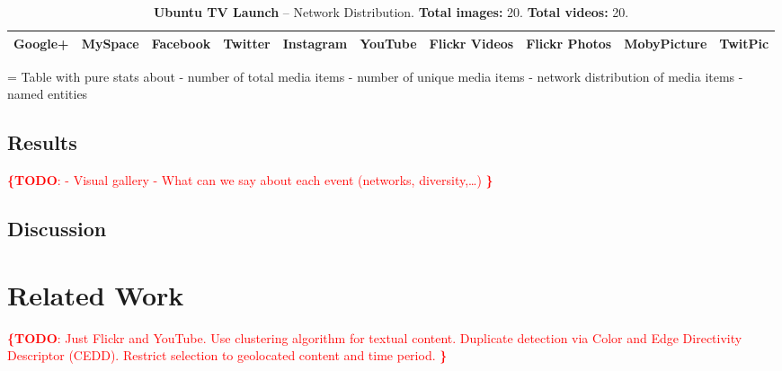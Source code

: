\documentclass{acm_proc_article-sp}
\newcommand{\todo}[1]{\noindent\textcolor{red}{{\bf \{TODO}: #1{\bf \}}}}
\newenvironment{Todo}{\color{red}{\par{\bf TODO}}\everypar={\color{red}}{}}{}
\begin{document}
\begin{table}[htbp]
  \begin{tabular}{ | c | c | c | c | c | c | c | c | c | c | }
    \hline
    Google+ & MySpace & Facebook & Twitter & Instagram & YouTube & Flickr Videos & Flickr Photos & MobyPicture & TwitPic\\
    \hline

    \hline
  \end{tabular}
  \label{tab:assad}
  \caption{\textbf{Ubuntu TV Launch} -- Network Distribution. \textbf{Total images:} 20. \textbf{Total videos:} 20.}
\end{table}

\begin{Todo}
Table with pure stats about
- number of total media items
- number of unique media items
- network distribution of media items 
- named entities

\end{Todo}

\subsection{Results}
\todo{
- Visual gallery
- What can we say about each event (networks, diversity,…)
}

\subsection{Discussion}

\section{Related Work} \label{sec:relatedwork}


\todo{
\cite{Fabro2012}
Just Flickr and YouTube.
Use clustering algorithm for textual content.
Duplicate detection via Color and Edge Directivity Descriptor (CEDD).
Restrict selection to geolocated content and time period.
}
\end{document}
